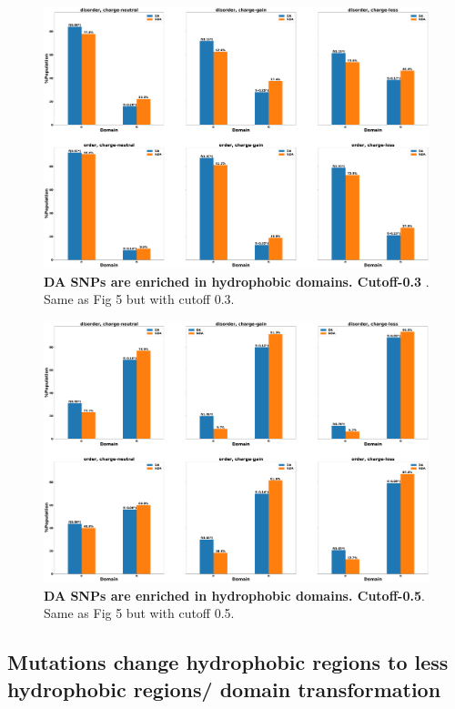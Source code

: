 \documentclass[10pt,letterpaper]{article}
\begin{document}
\begin{figure}[!ht]
\includegraphics[scale=0.1,width=\textwidth,trim={0 0cm 0 0cm},clip]{./figures/charge_vs_no_charge_order_vs_disorder_SNP_Domain_three.pdf}
\caption{{\bf DA SNPs are enriched in hydrophobic domains. Cutoff-0.3} . Same as Fig 5 but with cutoff 0.3.}
\label{fig5} 
\end{figure}

\begin{figure}[!ht]
\includegraphics[scale=0.1,width=\textwidth,trim={0 0cm 0 0cm},clip]{./figures/charge_vs_no_charge_order_vs_disorder_SNP_Domain_five.pdf}
\caption{{\bf DA SNPs are enriched in hydrophobic domains. Cutoff-0.5}. Same as Fig 5 but with cutoff 0.5.}
\label{fig5} 
\end{figure}

\clearpage
\subsection*{Mutations change hydrophobic regions to less hydrophobic regions/ domain transformation}
\end{document}
